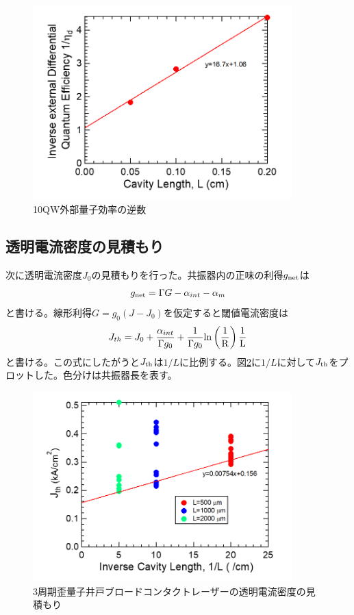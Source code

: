 {\begin{figure}[h]
	\centering
	\includegraphics[width=10cm]{figure/fig_3_1_10QW_broadcontact_id_inverse.png}
	\caption{10QW外部量子効率の逆数}
	\label{fig:fig_3_1_10QW_broadcontact_id_inverse}
\end{figure}

\clearpage
\subsection{透明電流密度の見積もり}

次に透明電流密度$J_{0}$の見積もりを行った。共振器内の正味の利得$g_{\rm{net}}$は
\begin{eqnarray}
g_{\rm{net}}=\Gamma G-\alpha_{int}-\alpha_{m}
\label{eq:eta_j0}
\end{eqnarray}
と書ける。線形利得$G=g_{0}(J-J_{0})$を仮定すると閾値電流密度は
\begin{eqnarray}
J_{th}=J_{0}+\dfrac{\alpha_{int}}{\Gamma g_{0}}+\dfrac{1}{\Gamma g_{0}}\rm{ln}\left(\dfrac{1}{R}\right)\dfrac{1}{L}
\label{eq:j_th}
\end{eqnarray}
と書ける。この式にしたがうと$J_{\rm{th}}$は$1/L$に比例する。図\ref{fig:fig_3_1_3QW_broadcontact_j0}に$1/L$に対して$J_{\rm{th}}$をプロットした。色分けは共振器長を表す。
\begin{figure}[h]
	\centering
	\includegraphics[width=10cm]{figure/fig_3_1_3QW_broadcontact_j0.png}
	\caption{3周期歪量子井戸ブロードコンタクトレーザーの透明電流密度の見積もり}
	\label{fig:fig_3_1_3QW_broadcontact_j0}
\end{figure}

}
